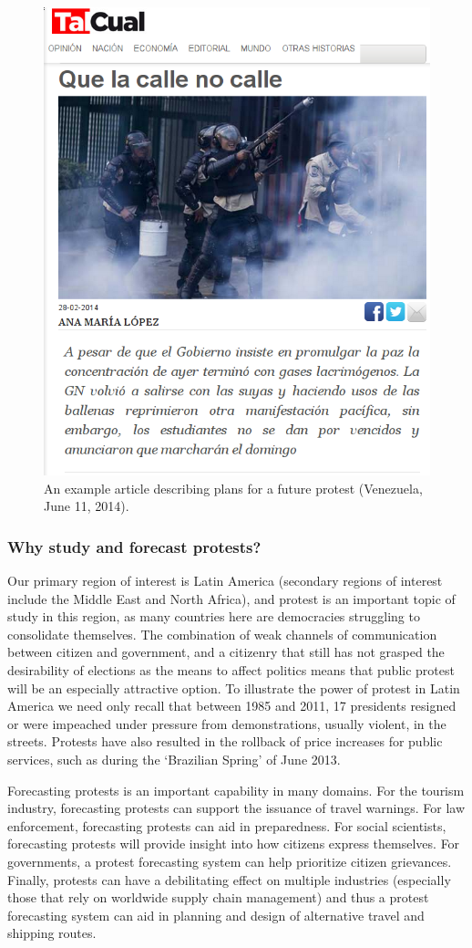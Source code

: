 \documentclass[letterpaper]{article}
\begin{document}
\begin{figure}
  \centering
    \includegraphics[width=.4\textwidth]{pp_AIMag_screenshot}
    \caption{An example article describing plans for a future protest (Venezuela, June 11, 2014).}
    \label{pp_example}
\end{figure}

\subsubsection{Why study and forecast protests?}
Our primary region of interest is Latin America (secondary regions of
interest include the Middle East and North Africa), and protest is an
important topic of study in this region, as many countries here are
democracies struggling to consolidate themselves. The combination of
weak channels of communication between citizen and government, and a
citizenry that still has not grasped the desirability of elections as
the means to affect politics means that public protest will be an
especially attractive option. To illustrate the power of protest in
Latin America we need only recall that between 1985 and 2011, 17
presidents resigned or were impeached under pressure from
demonstrations, usually violent, in the streets. Protests have also
resulted in the rollback of price increases for public services, such as
during the ‘Brazilian Spring’ of June 2013.

Forecasting protests is an important capability in many domains.  For
the tourism industry, forecasting protests can support the issuance of
travel warnings. For law enforcement, forecasting protests can aid in
preparedness. For social scientists, forecasting protests will provide
insight into how citizens express themselves.  For governments, a
protest forecasting system can help prioritize citizen grievances.
Finally, protests can have a debilitating effect on multiple industries
(especially those that rely on worldwide supply chain management) and
thus a protest forecasting system can aid in planning and design of
alternative travel and shipping routes.
\end{document}
